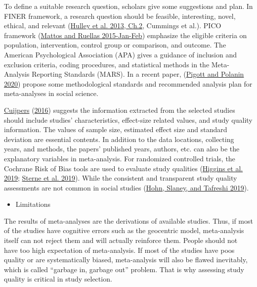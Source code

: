 \documentclass[
  11pt,
  openany]{memoir}
\providecommand{\tightlist}{%
  \setlength{\itemsep}{0pt}\setlength{\parskip}{0pt}}
\begin{document}
To define a suitable research question, scholars give some suggestions and plan.
In FINER framework, a research question should be feasible, interesting, novel, ethical, and relevant (\protect\hyperlink{ref-hulleyDesigningClinicalResearch2013}{Hulley et al. 2013, Ch.2}, Cummings et al.).
PICO framework (\protect\hyperlink{ref-mattosSystematicReviewMetaanalysis2015}{Mattos and Ruellas 2015-Jan-Feb}) emphasize the eligible criteria on population, intervention, control group or comparison, and outcome.
The American Psychological Association (APA) gives a guidance of inclusion and exclusion criteria, coding procedures, and statistical methods in the Meta-Analysis Reporting Standards (MARS).
In a recent paper, (\protect\hyperlink{ref-pigottMethodologicalGuidancePaper2020}{Pigott and Polanin 2020}) propose some methodological standards and recommended analysis plan for meta-analyses in social science.

\protect\hyperlink{ref-cuijpersMetaanalysesMentalHealth2016}{Cuijpers} (\protect\hyperlink{ref-cuijpersMetaanalysesMentalHealth2016}{2016}) suggests the information extracted from the selected studies should include
studies' characteristics, effect-size related values, and study quality information.
The values of sample size, estimated effect size and standard deviation are essential contents.
In addition to the data locations, collecting years, and methods, the papers' published years, authors, etc. can also be the explanatory variables in meta-analysis.
For randomized controlled trials, the Cochrane Risk of Bias tools are used to evaluate study qualities (\protect\hyperlink{ref-higginsCochraneHandbookSystematic2019}{Higgins et al. 2019}; \protect\hyperlink{ref-sterneRoBRevisedTool2019}{Sterne et al. 2019}). While the consistent and transparent study quality assessments are not common in social studies (\protect\hyperlink{ref-hohnPrimaryStudyQuality2019}{Hohn, Slaney, and Tafreshi 2019}).

\begin{itemize}
\tightlist
\item
  Limitations
\end{itemize}

The results of meta-analyses are the derivations of available studies. Thus, if most of the studies have cognitive errors such as the geocentric model, meta-analysis itself can not reject them and will actually reinforce them. People should not have too high expectation of meta-analysis.
If most of the studies have poos quality or are systematically biased, meta-analysis will also be flawed inevitably, which is called ``garbage in, garbage out'' problem. That is why assessing study quality is critical in study selection.
\end{document}
